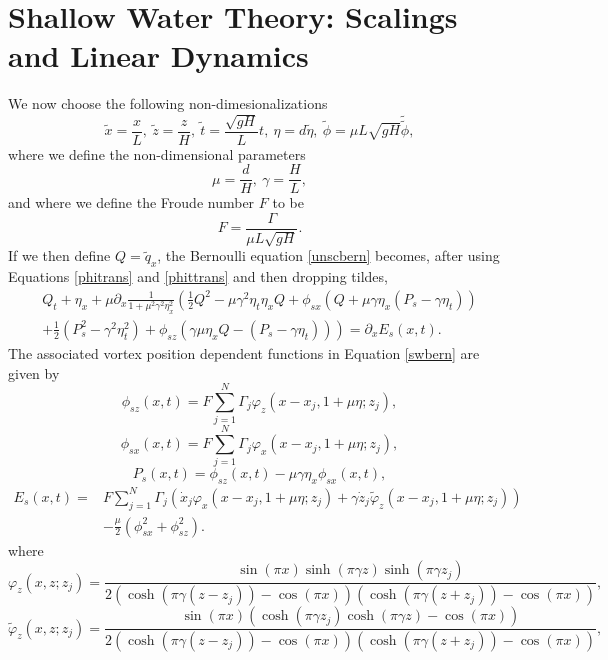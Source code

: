 \documentclass[a4paper,11pt]{article}
\newcommand{\p}{\partial}
\begin{document}
\section{Shallow Water Theory: Scalings and Linear Dynamics}
We now choose the following non-dimesionalizations 
\[
\tilde{x} = \frac{x}{L}, ~\tilde{z} = \frac{z}{H}, ~ \tilde{t} = \frac{\sqrt{gH}}{L} t, ~ \eta = d\tilde{\eta}, ~ \tilde{\phi} = \mu L\sqrt{gH} \tilde{\tilde{\phi}},
\]
where we define the non-dimensional parameters
\[
\mu= \frac{d}{H}, ~ \gamma = \frac{H}{L},
\]
and where we define the Froude number $F$ to be 
\[
F = \frac{\Gamma}{\mu L \sqrt{gH}}.
\]
If we then define $Q = \tilde{q}_{x}$, the Bernoulli equation \eqref{unscbern} becomes, after using Equations \eqref{phitrans} and \eqref{phittrans} and then dropping tildes,  
\begin{align}
Q_{t} + \eta_{x} + \mu\p_{x}\frac{1}{1+ \mu^{2}\gamma^{2}\eta_{x}^{2}} \left( \frac{1}{2}Q^{2} - \mu \gamma^{2}\eta_{t}\eta_{x}Q  +  \phi_{sx} (Q + \mu\gamma\eta_{x}( P_{s}-\gamma\eta_{t}))   \right. \nonumber \\
\left. + \frac{1}{2}\left(P_{s}^{2}-\gamma^{2}\eta_{t}^{2} \right)+ \phi_{sz}\left(\gamma \mu \eta_{x}Q-\left(P_{s}-\gamma \eta_{t}\right) \right) \right)= \p_{x}E_{s}(x,t). \label{swbern}
\end{align}
The associated vortex position dependent functions in Equation \eqref{swbern} are given by   
\[
\phi_{sz}(x,t) =  F\sum_{j=1}^{N} \Gamma_{j}\varphi_{z}(x-x_{j},1+\mu \eta;z_{j}),
\]
\[
\phi_{sx}(x,t) = F\sum_{j=1}^{N}\Gamma_{j}\varphi_{x}(x-x_{j},1+\mu \eta;z_{j}),
\]
\[
P_{s}(x,t) = \phi_{sz}(x,t)-\mu\gamma \eta_{x}\phi_{sx}(x,t),
\]
\begin{align*}
E_{s}(x,t) = & F\sum_{j=1}^{N}\Gamma_{j}\left(\dot{x}_{j}\varphi_{x}(x-x_{j},1+\mu\eta;z_{j}) + \gamma\dot{z}_{j}\tilde{\varphi}_{z}(x-x_{j},1+\mu\eta;z_{j}) \right)\\
& -\frac{\mu}{2}\left(\phi_{sx}^{2} + \phi_{sz}^{2}\right).
\end{align*}
where
\[
\varphi_{z}(x,z;z_{j}) = \frac{\sin(\pi x)\sinh(\pi \gamma z)\sinh(\pi \gamma z_{j})}{2\left(\cosh(\pi\gamma(z-z_{j}))-\cos(\pi x)\right) \left(\cosh(\pi\gamma(z+z_{j}))-\cos(\pi x)\right)},
\]
\[
\tilde{\varphi}_{z}(x,z;z_{j}) = \frac{\sin(\pi x)\left(\cosh(\pi \gamma z_{j})\cosh(\pi \gamma z)-\cos(\pi x)\right)}{2\left(\cosh(\pi\gamma(z-z_{j}))-\cos(\pi x)\right) \left(\cosh(\pi\gamma(z+z_{j}))-\cos(\pi x)\right)},
\]
\end{document}
